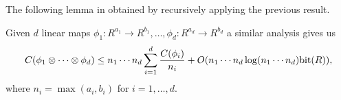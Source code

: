 The following lemma in obtained by recursively applying the previous result.

\begin{lemma}\label{lem:multi-dim-dft}
    Given $d$ linear maps $\phi_1: R^{a_1} \to R^{b_1}, \ldots, \phi_d: R^{a_d} \to R^{b_d}$ a similar analysis gives us
    \[
        C(\phi_1 \otimes \cdots \otimes \phi_d) \leq n_1\cdots n_d \sum^d_{i = 1} \frac{C(\phi_i)}{n_i} + O(n_1\cdots n_d \log (n_1 \cdots n_d) \textrm{bit}(R)),
    \]
    where $n_i = \max(a_i, b_i)$ for $i = 1, \ldots, d$.
\end{lemma}




